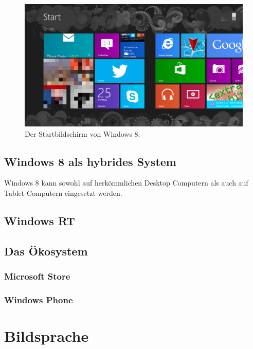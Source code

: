 \documentclass[12pt,a4paper]{scrartcl}
\begin{document}
\begin{figure}[h]	
	\centering
	\includegraphics[width=\textwidth]{Bilder/Screenshots/windows8/win8_startscreen.png} 
	\caption{Der Startbildschirm von Windows 8.}
	\label{fig:win8startscreen}
\end{figure}


\subsection{Windows 8 als hybrides System}
\label{subsec:hybrides system}
Windows 8 kann sowohl auf herkömmlichen Desktop Computern als auch auf Tablet-Computern eingesetzt werden. 
\subsection{Windows RT}
\label{subsec:winRT}
\subsection{Das Ökosystem}
\label{subsec:ökosystem}
\subsubsection{Microsoft Store}
\label{subsubsec:store}
\subsubsection{Windows Phone}
\label{subsubsec:windowsphone}

\newpage
\section{Bildsprache}

\newpage
\end{document}
